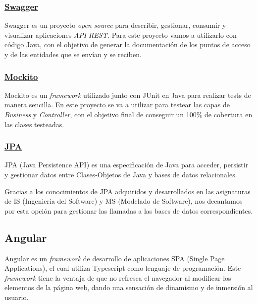     

        \subsubsection{\underline{Swagger}}
        Swagger\cite{swagger} es un proyecto \textit{open source} para describir, gestionar, consumir y visualizar aplicaciones \textit{API REST.} Para este proyecto vamos a utilizarlo con código Java, con el objetivo de generar la documentación de los puntos de acceso y de las entidades que se envían y se reciben.

        
        \subsubsection{\underline{Mockito}}
        Mockito\cite{mockito} es un \textit{framework} utilizado junto con JUnit\cite{junit} en Java para realizar tests de manera sencilla. En este proyecto se va a utilizar para testear las capas de \emph{Business} y \emph{Controller}, con el objetivo final de conseguir un 100\% de cobertura en las clases testeadas.
        \newline
        

        \subsubsection{\underline{JPA}}
        JPA\cite{jpa} (Java Persistence API) es una especificación de Java para acceder, persistir y gestionar datos entre Clases-Objetos de Java y bases de datos relacionales.
        \newline
        
        Gracias a los conocimientos de JPA adquiridos y desarrollados en las asignaturas de IS (Ingeniería del Software) y MS (Modelado de Software), nos decantamos por esta opción para gestionar las llamadas a las bases de datos correspondientes.
        

     \subsection{Angular}
       Angular\cite{angular} es un \textit{framework} de desarrollo de aplicaciones SPA (Single Page Applications), el cual utiliza Typescript como lenguaje de programación. Este \textit{framework} tiene la ventaja de que no refresca el navegador al modificar los elementos de la página web, dando una sensación de dinamismo y de inmersión al usuario.
       \newline
       
